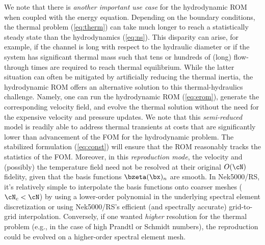 We note that there is {\em another important use case} for the hydrodynamic ROM
when coupled with the energy equation.  Depending on the boundary conditions,
the thermal problem (\ref{eq:therm}) can take much longer to reach a
statistically steady state than the hydrodynamics (\ref{eq:ns}).
This disparity can arise, for example, if the channel is long with respect to
the hydraulic diameter or if the system has significant thermal mass such that
tens or hundreds of (long) flow-through times are required to reach thermal
equilibrium.  While the latter situation can often be mitigated by artificially
reducing the thermal inertia, the hydrodynamic ROM offers an alternative
solution to this thermal-hydraulics challenge.  Namely, one can run the
hydrodynamic ROM (\ref{eq:erom}), generate the corresponding velocity field,
and evolve the thermal solution without the need for the expensive velocity
and pressure updates.  We note that this {\em semi-reduced} model is
readily able to address thermal transients at costs that are significantly lower
than advancement of the FOM for the hydrodynamic problem. The stabilized
formulation (\ref{eq:const}) will ensure that the ROM reasonably tracks the
statistics of the FOM.  Moreover, in this {\em reproduction mode}, the velocity
and (possibly) the temperature field need not be resolved at their original
$O(\cN)$ fidelity, given that the basis functions $\bzeta(\bx)_n$ are smooth.
In Nek5000/RS, it's relatively simple to interpolate the basis functions onto
coarser meshes ($\cN_c < \cN$) by using a lower-order polynomial in the
underlying spectral element discretization or using Nek5000/RS's efficient (and
spectrally accurate) grid-to-grid interpolation.  Conversely, if one wanted
{\em higher} resolution for the thermal problem (e.g., in the case of high
Prandtl or Schmidt numbers), the reproduction could be evolved on a
higher-order spectral element mesh.

\vspace*{.1in}




